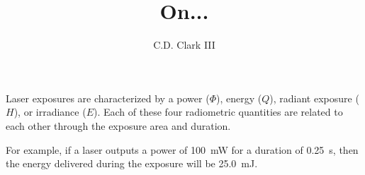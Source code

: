 \documentclass[]{article}
\author{C.D. Clark III}
\title{On...}
\begin{document}
\maketitle


Laser exposures are characterized by a power ($\Phi$), energy ($Q$), radiant exposure ($H$),
or irradiance ($E$). Each of these four radiometric quantities are related to each other
through the exposure area and duration.


For example, if a laser outputs a power of \SI[]{100}{\milli\watt} for a
duration of \SI[]{0.25}{\second}, then the energy delivered during the
exposure will be \SI[]{25.0}{\milli\joule}.
\end{document}
